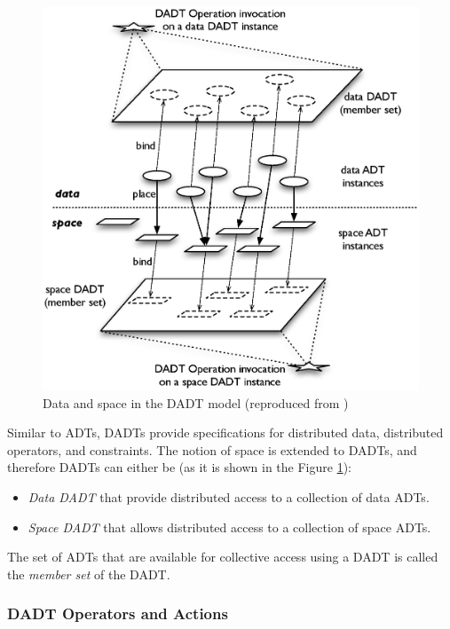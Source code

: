 \begin{figure}[h]
\centering
\includegraphics[scale=0.65]{img/DADTs.eps} 
\caption[Data and space in the DADT model]{Data and space in the DADT model (reproduced from 
\cite{migliavacca_DADT:2006})}
\label{Fig:DADTs}
\end{figure}

Similar to ADTs, DADTs 
provide specifications for distributed data, distributed operators, and 
constraints. The notion of space is extended to DADTs, and therefore DADTs can
either be (as it is shown in the Figure \ref{Fig:DADTs}):

\begin{itemize}
  \item \emph{Data DADT} that provide distributed access to a collection of data
  ADTs.
  \item \emph{Space DADT} that allows distributed access to a collection of
  space ADTs. 
\end{itemize}

The set of ADTs that are available for collective access using a DADT is called the \emph{member set} of
the DADT.

\subsubsection{DADT Operators and Actions} \label{subsubsec:OperatorsAndActions}

